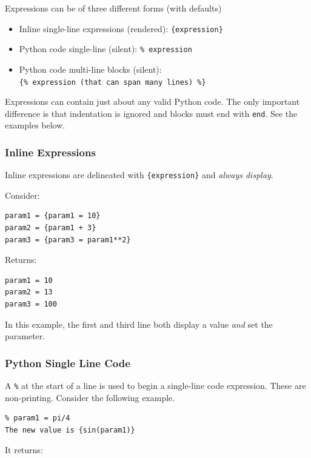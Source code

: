 {Expressions can be of three different forms (with defaults)

\begin{itemize}
\tightlist
\item
  Inline single-line expressions (rendered): \texttt{\{expression\}}
\item
  Python code single-line (silent): \texttt{\%\ expression}
\item
  Python code multi-line blocks (silent):
  \texttt{\{\%\ expression\ (that\ can\ span\ many\ lines)\ \%\}}
\end{itemize}

Expressions can contain just about any valid Python code. The only
important difference is that indentation is ignored and blocks must end 
with \texttt{end}. See the examples below.

\subsubsection{Inline Expressions}\label{interfaces:inline-expressions}

Inline expressions are delineated with \texttt{\{expression\}} and
\emph{always display}.

Consider:

\begin{verbatim}
param1 = {param1 = 10}
param2 = {param1 + 3}
param3 = {param3 = param1**2}
\end{verbatim}

Returns:

\begin{verbatim}
param1 = 10
param2 = 13
param3 = 100
\end{verbatim}

In this example, the first and third line both display a value
\emph{and} set the parameter.

\subsubsection{Python Single Line Code}\label{interfaces:python-single-line-code}

A \texttt{\%} at the start of a line is used to begin a single-line code expression.
These are non-printing.
Consider the following example.

\begin{verbatim}
% param1 = pi/4
The new value is {sin(param1)}
\end{verbatim}

It returns:

}
